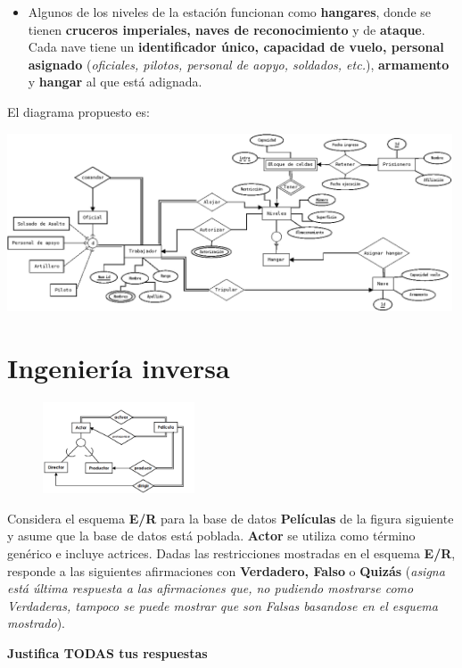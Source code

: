 \documentclass{article}
\begin{document}
\begin{enumerate}[label = (\alph*)]
{\begin{itemize}
{                    \textbf{afiliación} (por ejemplo, la escoria Rebelde).
                }
                \item {
                    Algunos de los niveles de la estación funcionan como 
                    \textbf{hangares}, donde se tienen \textbf{cruceros 
                    imperiales, naves de reconocimiento} y de \textbf{ataque}.
                    Cada nave tiene un \textbf{identificador único, capacidad de
                    vuelo, personal asignado} (\textit{oficiales, pilotos, 
                    personal de aopyo, soldados, etc.}), \textbf{armamento} y 
                    \textbf{hangar} al que está adignada.
                }
            \end{itemize}
            El diagrama propuesto es:
            \begin{center}
                \includegraphics[width=0.99\textwidth]{estrella-er.png}
            \end{center}  
        }
    \end{enumerate}
    \newpage
    \section{Ingeniería inversa}
    
    {
    \begin{figure}
        \vspace{-1.5cm}
        \centering
        \includegraphics[width=0.40\textwidth]{peliculas-er.png}
    \end{figure}

    Considera el esquema \textbf{E/R} para la base de datos \textbf{Películas} 
    de la figura siguiente y asume que la base de datos está poblada. 
    \textbf{Actor} se utiliza como término genérico e incluye actrices. Dadas 
    las restricciones mostradas en el esquema \textbf{E/R}, responde a las 
    siguientes afirmaciones con \textbf{Verdadero, Falso} o \textbf{Quizás}
    (\textit{asigna está última respuesta a las afirmaciones que, no pudiendo 
    mostrarse como Verdaderas, tampoco se puede mostrar que son Falsas basandose
    en el esquema mostrado}).

    \textbf{Justifica TODAS tus respuestas}
    
    }
    
\end{document}
